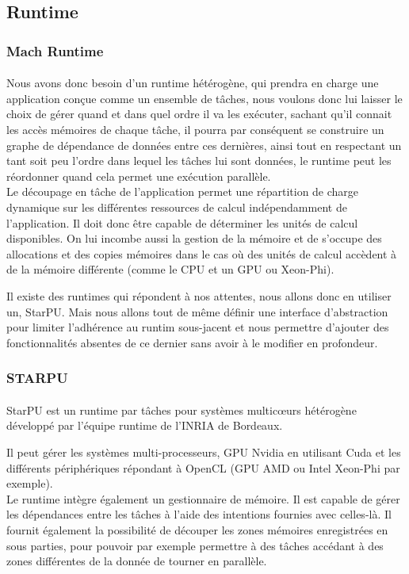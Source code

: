 \subsection{Runtime}
\subsubsection{Mach Runtime}
\paragraph{}
Nous avons donc besoin d'un runtime hétérogène, qui prendra en charge une
application conçue comme un ensemble de tâches, nous voulons donc lui laisser le
choix de gérer quand et dans quel ordre il va les exécuter, sachant qu'il
connait les accès mémoires de chaque tâche, il pourra par conséquent se
construire un graphe de dépendance de données entre ces dernières, ainsi tout en
respectant un tant soit peu l'ordre dans lequel les tâches lui sont données, le
runtime peut les réordonner quand cela permet une exécution parallèle.\\
Le découpage en tâche de l’application permet une répartition de charge
dynamique sur les différentes ressources de calcul indépendamment de
l’application. Il doit donc être capable de déterminer les unités de calcul
disponibles. On lui incombe aussi la gestion de la mémoire et de s’occupe des
allocations et des copies mémoires dans le cas où des unités de calcul accèdent
à de la mémoire différente (comme le CPU et un GPU ou Xeon-Phi).

Il existe des runtimes qui répondent à nos attentes, nous allons donc en
utiliser un, StarPU. Mais nous allons tout de même définir une interface
d'abstraction pour limiter l'adhérence au runtim sous-jacent et nous permettre
d'ajouter des fonctionnalités absentes de ce dernier sans avoir à le modifier en
profondeur.

\subsubsection{STARPU}
\paragraph{}
StarPU est un runtime par tâches pour systèmes multic\oe{}urs hétérogène
développé par l'équipe runtime de l'INRIA de Bordeaux.

Il peut gérer les systèmes multi-processeurs, GPU Nvidia en utilisant Cuda et
les différents périphériques répondant à OpenCL (GPU AMD ou Intel Xeon-Phi par
exemple).\\
Le runtime intègre également un gestionnaire de mémoire. Il est capable de gérer
les dépendances entre les tâches à l’aide des intentions fournies avec
celles-là. Il fournit également la possibilité de découper les zones mémoires
enregistrées en sous parties, pour pouvoir par exemple permettre à des tâches
accédant à des zones différentes de la donnée de tourner en parallèle.

